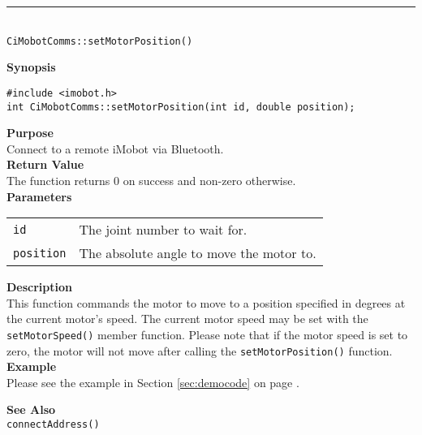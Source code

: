 \noindent
\vspace{5pt}
\rule{4.5in}{0.015in}\\
\noindent
{\LARGE \texttt{CiMobotComms::setMotorPosition()}}\\
{}

\noindent
{\bf Synopsis}\\
\begin{verbatim}
#include <imobot.h>
int CiMobotComms::setMotorPosition(int id, double position);
\end{verbatim}

\noindent
{\bf Purpose}\\
Connect to a remote iMobot via Bluetooth.\\

\noindent
{\bf Return Value}\\
The function returns 0 on success and non-zero otherwise.\\

\noindent
{\bf Parameters}\\
\vspace{-0.1in}
\begin{description}
\item               
\begin{tabular}{p{10 mm}p{145 mm}}
\texttt{id} & The joint number to wait for. \\
\texttt{position} & The absolute angle to move the motor to.  \\
\end{tabular}
\end{description}

\noindent
{\bf Description}\\
This function commands the motor to move to a position specified in degrees at
the current motor's speed. The current motor speed may be set with the
\texttt{setMotorSpeed()} member function. Please note that if the motor speed
is set to zero, the motor will not move after calling the
\texttt{setMotorPosition()} function. \\

\noindent
{\bf Example}\\
Please see the example in Section \ref{sec:democode} on page \pageref{sec:democode}.\\
\noindent

\noindent
{\bf See Also}\\
\texttt{connectAddress()}

